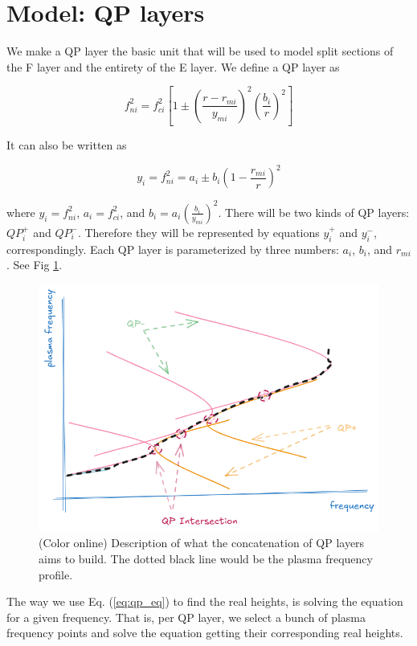 \documentclass[aps,twocolumn,prb,showpacs,superscriptaddress]{revtex4-2}
\newcommand{\+}{\dagger}
\begin{document}
\section{Model: QP layers}
We make a QP layer the basic unit that will be used to model split sections of the F layer and the entirety of the E layer. We define a QP layer as

\begin{equation}
f_{ni}^2 = f_{ci}^2 \left[ 1 \pm \left( \frac{r - r_{mi}}{y_{mi}} \right)^2 \left( \frac{b_i}{r} \right)^2 \right]
\label{eq:qp_eq}
\end{equation}

It can also be written as

\begin{equation}
y_i = f_{ni}^2 = a_i \pm b_i \left( 1 - \frac{r_{mi}}{r} \right)^2
\label{eq:QP_other_form}
\end{equation}

where $y_i = f_{ni}^2$, $a_i = f_{ci}^2$, and $b_i = a_i \left( \frac{b_i}{y_{mi}} \right)^2$. There will be two kinds of QP layers: $QP_i^+$ and $QP_i^-$. Therefore they will be represented by equations $y_i^+$ and $y_i^-$, correspondingly. Each QP layer is parameterized by three numbers: $a_i$, $b_i$, and $r_{mi}$. See Fig \ref{fig:cute}.

\begin{figure}[hb]
    \begin{center}
    \includegraphics*[width=0.90\columnwidth]{images/cute_description.jpg}
    \end{center}
    \caption{(Color online) Description of what the concatenation of QP layers aims to build. The dotted black line would be the plasma frequency profile.}
    \label{fig:cute}
\end{figure}
The way we use Eq. (\ref{eq:qp_eq}) to find the real heights, is solving the equation for a given frequency. That is, per QP layer, we select a bunch of plasma frequency points and solve the equation getting their corresponding real heights.  
\end{document}
